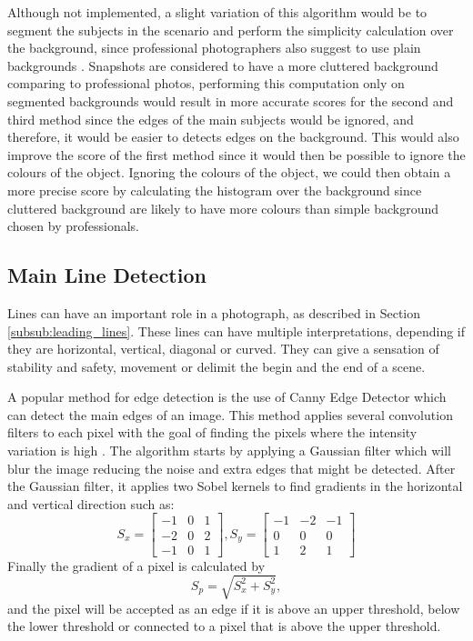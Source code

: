 Although not implemented, a slight variation of this algorithm would be to segment the subjects in the scenario and perform the simplicity calculation over the background, since professional photographers also suggest to use plain backgrounds \cite{Santos}. Snapshots are considered to have a more cluttered background comparing to professional photos, performing this computation only on segmented backgrounds would result in more accurate scores for the second and third method since the edges of the main subjects would be ignored, and therefore, it would be easier to detects edges on the background. This would also improve the score of the first method since it would then be possible to ignore the colours of the object. Ignoring the colours of the object, we could then obtain a more precise score by calculating the histogram over the background since cluttered background are likely to have more colours than simple background chosen by professionals.

\subsection{Main Line Detection}
\label{sub:line_detection}

Lines can have an important role in a photograph, as described in Section \ref{subsub:leading_lines}. These lines can have multiple interpretations, depending if they are horizontal, vertical, diagonal or curved. They can give a sensation of stability and safety, movement or delimit the begin and the end of a scene.

A popular method for edge detection is the use of Canny Edge Detector \cite{canny1986computational} which can detect the main edges of an image. This method applies several convolution filters to each pixel with the goal of finding the pixels where the intensity variation is high \cite{nobrega2013interactive}.
The algorithm starts by applying a Gaussian filter which will blur the image reducing the noise and extra edges that might be detected. After the Gaussian filter, it applies two Sobel kernels to find gradients in the horizontal and vertical direction such as:
\begin{equation}
S_{x} =
\begin{bmatrix}
	-1 & 0 & 1\\
	-2 & 0 & 2\\
	-1 & 0 & 1
\end{bmatrix}
,
S_{y} = 
\begin{bmatrix}
	-1 & -2 & -1\\
	0 & 0 & 0\\
	1 & 2 & 1
\end{bmatrix}
\end{equation}
Finally the gradient of a pixel is calculated by
\begin{equation}
	S_{p} = \sqrt{S_{x}^{2} + S_{y}^{2}},
\end{equation}
and the pixel will be accepted as an edge if it is above an upper threshold, below the lower threshold or connected to a pixel that is above the upper threshold.

